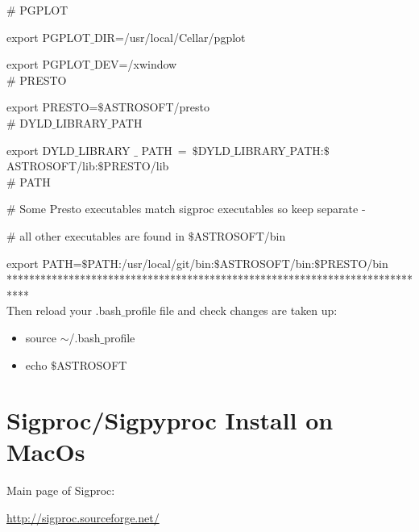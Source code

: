 \documentclass{article}
\begin{document}
$\#$ PGPLOT

export PGPLOT$\_$DIR=/usr/local/Cellar/pgplot

export PGPLOT$\_$DEV=/xwindow \\

$\#$ PRESTO

export PRESTO=$\$$ASTROSOFT/presto\\

$\#$ DYLD$\_$LIBRARY$\_$PATH

export DYLD$\_$LIBRARY $\_$ PATH~=~$\$$DYLD$\_$LIBRARY$\_$PATH:$\$$ASTROSOFT/lib:$\$$PRESTO/lib \\

$\#$ PATH 

$\#$ Some Presto executables match sigproc executables so keep separate -

$\#$ all other executables are found in $\$$ASTROSOFT/bin

export PATH=$\$$PATH:/usr/local/git/bin:$\$$ASTROSOFT/bin:$\$$PRESTO/bin
****************************************************************************\\

Then reload your .bash$\_$profile file and check changes are taken up:
\begin{itemize}
\item source $\sim$/.bash$\_$profile
\item echo $\$$ASTROSOFT
\end{itemize}
\section{Sigproc/Sigpyproc Install on MacOs} 
Main page of Sigproc:   
  
 \url{http://sigproc.sourceforge.net/} \\
\end{document}
